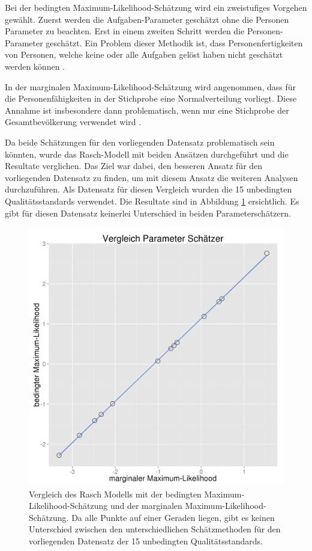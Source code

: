 Bei der bedingten Maximum-Likelihood-Schätzung wird ein zweistufiges Vorgehen gewählt. Zuerst werden die Aufgaben-Parameter geschätzt ohne die Personen Parameter zu beachten. Erst in einem zweiten Schritt werden die Personen-Parameter geschätzt. Ein Problem dieser Methodik ist, dass Personenfertigkeiten von Personen, welche keine oder alle Aufgaben gelöst haben nicht geschätzt werden können \citep{Mair2007}.

In der marginalen Maximum-Likelihood-Schätzung wird angenommen, dass für die Personenfähigkeiten in der Stichprobe eine Normalverteilung vorliegt. Diese Annahme ist insbesondere dann problematisch, wenn nur eine Stichprobe der Gesamtbevölkerung verwendet wird \citep{Rizopoulos2006}.

Da beide Schätzungen für den vorliegenden Datensatz problematisch sein könnten, wurde das Rasch-Modell mit beiden Ansätzen durchgeführt und die Resultate verglichen. Das Ziel war dabei, den besseren Ansatz für den vorliegenden Datensatz zu finden, um mit diesem Ansatz die weiteren Analysen durchzuführen. Als Datensatz für diesen Vergleich wurden die 15 unbedingten Qualitätsstandards verwendet. Die Resultate sind in Abbildung \ref{fig:RaschVergleich} ersichtlich. Es gibt für diesen Datensatz keinerlei Unterschied in beiden Parameterschätzern.


\begin{figure}[htbp]

\centering
\includegraphics[width=0.7\linewidth]{graphics/RaschVergleich.png}
\caption{Vergleich des Rasch Modells mit der bedingten Maximum-Likelihood-Schätzung und der marginalen Maximum-Likelihood-Schätzung. Da alle Punkte auf einer Geraden liegen, gibt es keinen Unterschied zwischen den unterschiedlichen Schätzmethoden für den vorliegenden Datensatz der 15 unbedingten Qualitätsstandards.  }
\label{fig:RaschVergleich}
\end{figure}

